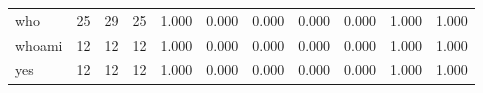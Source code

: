 \begin{longtable}{lp{1.2cm}p{1.2cm}p{1.2cm}p{1.2cm}p{1.2cm}p{1.2cm}p{1.2cm}p{1.2cm}p{1.2cm}p{1.2cm}}
who       &                           25 &                 29 &                                25 &                                      1.000 &                                  0.000 &                                        0.000 &                             0.000 &                                   0.000 &                              1.000 &                                              1.000 \\
whoami    &                           12 &                 12 &                                12 &                                      1.000 &                                  0.000 &                                        0.000 &                             0.000 &                                   0.000 &                              1.000 &                                              1.000 \\
yes       &                           12 &                 12 &                                12 &                                      1.000 &                                  0.000 &                                        0.000 &                             0.000 &                                   0.000 &                              1.000 &                                              1.000 \\
\end{longtable}
